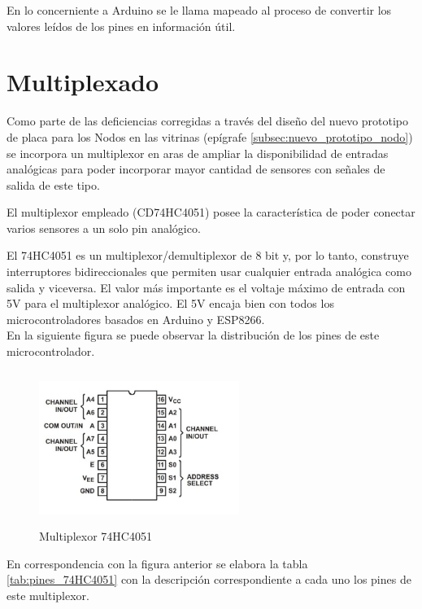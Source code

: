 En lo concerniente a Arduino se le llama mapeado al proceso de convertir los valores leídos de los pines en información útil. 

\section{Multiplexado}

Como parte de las deficiencias corregidas a través del diseño del nuevo prototipo de placa para los Nodos en las vitrinas (epígrafe \ref{subsec:nuevo_prototipo_nodo}) se incorpora un multiplexor en aras de ampliar la disponibilidad
de entradas analógicas para poder incorporar mayor cantidad de sensores con señales de salida de este tipo.

El multiplexor empleado (CD74HC4051) posee la característica de poder conectar varios sensores a un solo pin analógico.

El 74HC4051 es un multiplexor/demultiplexor de 8 bit y, por lo tanto, construye interruptores bidireccionales que permiten usar cualquier entrada analógica como salida y viceversa. El valor más importante es el voltaje máximo de entrada con 5V para el multiplexor analógico. El 5V encaja bien con todos los microcontroladores basados en Arduino y ESP8266.\\

En la siguiente figura se puede observar la distribución de los pines de este microcontrolador.

\begin{figure}[H]
    \centering
    \includegraphics[width=6.5cm, height=5cm]{imagenes/multiplexor.jpg}
    \caption{Multiplexor 74HC4051}
    \label{imag:multiplexor}
\end{figure}

\newpage

En correspondencia con la figura anterior se elabora la tabla \ref{tab:pines_74HC4051} con la descripción correspondiente a cada uno los pines de este multiplexor.

